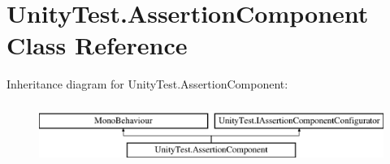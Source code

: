 \hypertarget{class_unity_test_1_1_assertion_component}{}\section{Unity\+Test.\+Assertion\+Component Class Reference}
\label{class_unity_test_1_1_assertion_component}
Inheritance diagram for Unity\+Test.\+Assertion\+Component\+:\begin{figure}[H]
\begin{center}
\leavevmode
\includegraphics[height=2.000000cm]{class_unity_test_1_1_assertion_component}
\end{center}
\end{figure}
